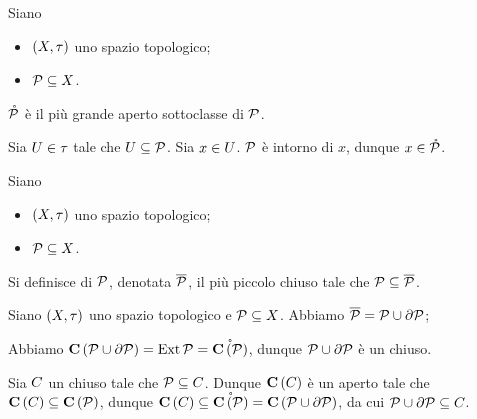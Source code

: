 \begin{Theorem}
	Siano
	\begin{itemize}
		\item $(X,\tau)$ uno spazio
		 topologico;
		\item $\mathcal{P} \subseteq X$.
	\end{itemize}
	$\mathring{\mathcal{P}}$ \`e il pi\`u grande aperto sottoclasse di
	$\mathcal{P}$.	
\end{Theorem}
\Proof Sia $U \in \tau$ tale che $U \subseteq \mathcal{P}$. Sia
$x \in U$. $\mathcal{P}$ \`e intorno di $x$, dunque $x \in
\mathring{\mathcal{P}}$. \EndProof
\begin{Definition}
	Siano
	\begin{itemize}
		\item $(X,\tau)$ uno spazio
		 topologico;
		\item $\mathcal{P} \subseteq X$.
	\end{itemize}
	Si definisce 	di $\mathcal{P}$, denotata
	$\overline{\mathcal{P}}$, il pi\`u piccolo chiuso tale che
	$\mathcal{P} \subseteq \overline{\mathcal{P}}$.
\end{Definition}
\begin{Theorem}
	Siano $(X,\tau)$ uno spazio topologico e $\mathcal{P} \subseteq X$.
	Abbiamo $\overline{\mathcal{P}} = \mathcal{P} \cup \partial{\mathcal{P}}$;
\end{Theorem}
\Proof Abbiamo $\mathbf{C} \left ( \mathcal{P} \cup \partial{\mathcal{P}} \right ) = \operatorname{Ext}{\mathcal{P}} =
\mathring{\mathbf{C} \left ( \mathcal{P} \right )}$, dunque $\mathcal{P} \cup \partial{\mathcal{P}}$ \`e un chiuso.
\par Sia $C$ un chiuso tale che $\mathcal{P} \subseteq C$. Dunque
$\mathbf{C} \left ( C \right )$ \`e un aperto tale che $\mathbf{C} \left ( C \right )
\subseteq \mathbf{C} \left ( \mathcal{P} \right )$, dunque $\mathbf{C} \left ( C \right ) \subseteq
\mathring{\mathbf{C} \left ( \mathcal{P} \right )} = \mathbf{C} \left ( \mathcal{P} \cup \partial{\mathcal{P}} \right )$, da cui
$\mathcal{P} \cup \partial{\mathcal{P}} \subseteq C$. \EndProof
